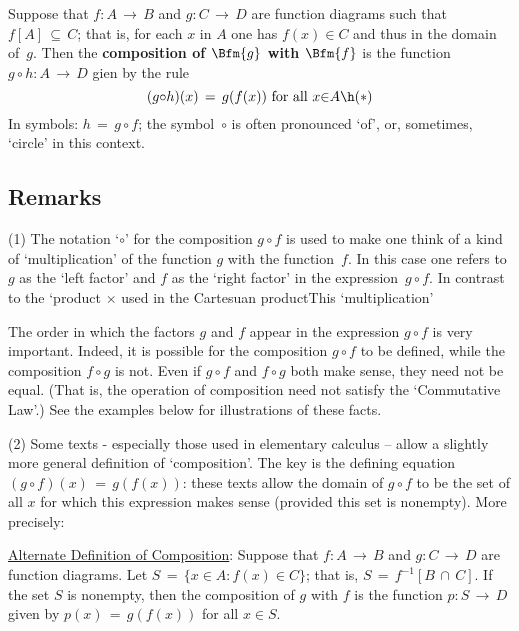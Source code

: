         Suppose that $f:A \,{\rightarrow}\, B$ and $g:C \,{\rightarrow}\, D$ are function diagrams such that $f[A] \,{\subseteq}\, C$; that is, for each $x$ in $A$ one has $f(x){\in}C$ and thus in the domain of~$g$. 
    Then the {\bf composition of $\Bfm{g}$ with $\Bfm{f}$} is the function $g{\circ}h:A \,{\rightarrow}\, D$ gien by the rule
        \begin{displaymath}
        (g{\circ}h)(x) \,=\, g(f(x)) \mbox{ for all $x{\in}A$} \h ({\ast})
        \end{displaymath}
    In symbols: $h \,=\, g{\circ}f$; the symbol~${\circ}$ is often pronounced `of', or, sometimes, `circle' in this context.

\V

        \subsection{\small{{\bf Remarks}}}
        \label{RemrkA30.140}

\V

\hspace*{\parindent} (1) The notation `${\circ}$' for the composition $g{\circ}f$ is used to make one think of a kind of `multiplication' of the function $g$ with the function~$f$.
    In this case one refers to $g$ as the `left factor' and $f$ as the `right factor' in the expression~$g{\circ}f$.
    In contrast to the `product ${\times}$ used in the Cartesuan productThis `multiplication'

        The order in which the factors $g$ and $f$ appear in the expression $g{\circ}f$ is very important.
    Indeed, it is possible for the composition $g{\circ}f$ to be defined, while the composition $f{\circ}g$ is not.
    Even if $g{\circ}f$ and $f{\circ}g$ both make sense, they need not be equal.
    (That is, the operation of composition need not satisfy the `Commutative Law'.)
    See the examples below for illustrations of these facts.

\V

        (2) Some texts - especially those used in elementary calculus -- allow a slightly more general definition of `composition'.
    The key is the defining equation $(g{\circ}f)(x) \,=\, g(f(x))$:
    these texts allow the domain of $g{\circ}f$ to be the set of all $x$ for which this expression makes sense (provided this set is nonempty). More precisely:

\V
        \underline{Alternate Definition of Composition}:
        Suppose that $f:A \,{\rightarrow}\, B$ and $g:C \,{\rightarrow}\, D$ are function diagrams. Let $S \,=\, \{x{\in}A: f(x){\in}C\}$; that is, $S \,=\, f^{-1}[B\,{\cap}\,C]$.
    If the set $S$ is nonempty, then the composition of $g$ with $f$ is the function
    $p:S \,{\rightarrow}\, D$ given by $p(x) \,=\, g(f(x))$ for all $x{\in}S$.

